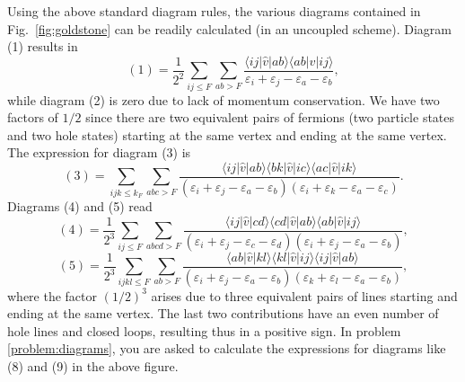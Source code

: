   Using the above standard diagram rules, the various
  diagrams contained in Fig.~\ref{fig:goldstone} can be readily calculated (in
  an uncoupled scheme). Diagram  (1) results in
  \begin{equation}
     (1)=\frac{1}{2^2}\sum_{ij\leq F}\sum_{ab>F}
    \frac{\langle ij\vert\hat{v}\vert ab\rangle \langle
      ab\vert\hat{v}\vert ij\rangle}
         {\varepsilon_i+\varepsilon_j-\varepsilon_a-\varepsilon_b},
  \end{equation}
 while diagram (2) is zero due to lack of momentum conservation. We have two factors of $1/2$ since there are two equivalent pairs of fermions (two  particle states and two hole states) starting at the same vertex and ending at the same vertex. The expression for diagram (3)  is 
  \begin{equation}\label{eq:diag3}
     (3)=\sum_{ijk\leq k_F}\sum_{abc > F}
    \frac{\langle ij\vert\hat{v}\vert ab\rangle \langle
      bk\vert\hat{v}\vert ic\rangle \langle ac\vert\hat{v}\vert
      ik\rangle}
         {(\varepsilon_i+\varepsilon_j-\varepsilon_a-\varepsilon_b)
           (\varepsilon_i+\varepsilon_k-\varepsilon_a-\varepsilon_c)}.
  \end{equation}
  Diagrams (4) and (5) read
  \begin{equation}\label{eq:diag4}
     (4)=\frac{1}{2^3}\sum_{ij\le F}\sum_{abcd > F}
    \frac{\langle ij\vert\hat{v}\vert cd\rangle \langle
      cd\vert\hat{v}\vert ab\rangle \langle ab\vert\hat{v}\vert
      ij\rangle}
         {(\varepsilon_i+\varepsilon_j-\varepsilon_c-\varepsilon_d)
           (\varepsilon_i+\varepsilon_j-\varepsilon_a-\varepsilon_b)},
  \end{equation}
  \begin{equation}\label{eq:diag5}
     (5)=\frac{1}{2^3}\sum_{ijkl\le F}\sum_{ab > F}
    \frac{\langle ab\vert\hat{v}\vert kl\rangle \langle
      kl\vert\hat{v}\vert ij\rangle \langle ij\vert\hat{v}\vert
      ab\rangle}
         {(\varepsilon_i+\varepsilon_j-\varepsilon_a-\varepsilon_b)
           (\varepsilon_k+\varepsilon_l-\varepsilon_a-\varepsilon_b)},
  \end{equation}
where the factor $(1/2)^3$ arises due to three equivalent pairs of lines starting and ending at the same vertex. The last two contributions 
have an even number of hole lines and closed loops, resulting thus in a positive sign. In problem \ref{problem:diagrams}, you are asked to calculate the expressions for diagrams like (8) and (9) in the above figure. 

